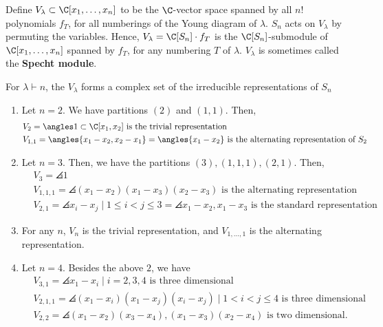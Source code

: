 \begin{defn}
    Define $V_\lambda\subset \C[x_1,\dots,x_n]$ to be the $\C$-vector space spanned by all $n!$ polynomials $f_T$, for all numberings of the Young diagram of $\lambda$. $S_n$ acts on $V_\lambda$ by permuting the variables. Hence, $V_\lambda = \C [S_n]\cdot f_T$ is the $\C[S_n]$-submodule of $\C[x_1,\dots,x_n]$ spanned by $f_T$, for any numbering $T$ of $\lambda$. $V_\lambda$ is sometimes called the \textbf{Specht module}.
\end{defn}

\begin{thm}
    For $\lambda \vdash n$, the $V_\lambda$ forms a complex set of the irreducible representations of $S_n$
\end{thm}

\begin{ex}
\hfill
\begin{enumerate}[(1)]
    \item Let $n=2$. We have partitions $(2)$ and $(1,1)$. Then,
    \begin{align*}
       & V_{2}=\angles 1\subset \C[x_1,x_2] \text{ is the trivial representation}
       \\ & V_{1,1}=\angles{x_1-x_2,x_2-x_1}=\angles{x_1-x_2} \text{ is the alternating representation of }S_2
    \end{align*}
    \item Let $n=3$. Then, we have the partitions $(3),(1,1,1),(2,1)$. Then,
    \begin{align*}
        & V_{3}=\angles 1
        \\ & V_{1,1,1}=\angles{(x_1-x_2)(x_1-x_3)(x_2-x_3)} \text{ is the alternating representation}
        \\ & V_{2,1}=\angles{x_i-x_j \mid 1\leq i<j\leq 3}=\angles{x_1-x_2,x_1-x_3} \text{ is the standard representation}
    \end{align*}
    \item For any $n$, $V_n$ is the trivial representation, and $V_{1,\dots,1}$ is the alternating representation.
    \item Let $n=4$. Besides the above $2$, we have
    \begin{align*}
        & V_{3,1}=\angles{x_1-x_i \mid i=2,3,4} \text{ is three dimensional}
        \\ & V_{2,1,1}=\angles{(x_1-x_i)(x_1-x_j)(x_i-x_j) \mid 1 <i<j\leq 4} \text{ is three dimensional}
        \\ & V_{2,2}=\angles{(x_1-x_2)(x_3-x_4),(x_1-x_3)(x_2-x_4)} \text{ is two dimensional.}

\end{align*}
\end{enumerate}
\end{ex}
